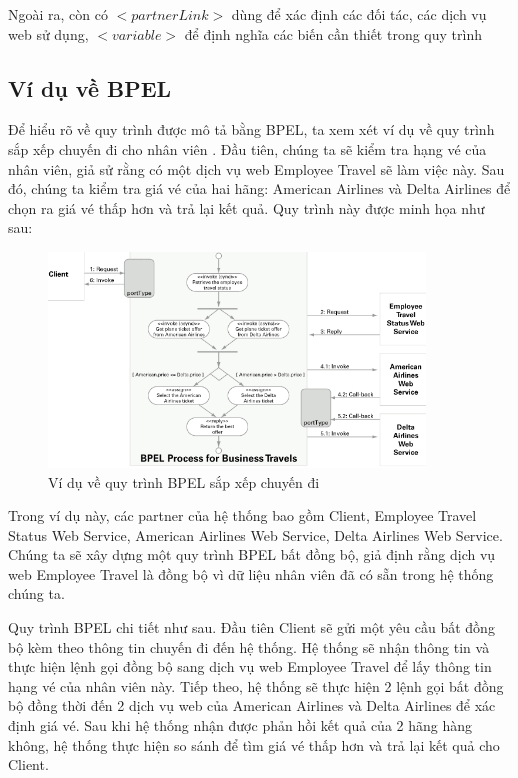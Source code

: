 Ngoài ra, còn có $<partnerLink>$ dùng để xác định các đối tác, các dịch vụ web sử dụng, $<variable>$ để định nghĩa các biến cần thiết trong quy trình


\subsection{Ví dụ về BPEL}

\hspace*{0.5cm} Để hiểu rõ về quy trình được mô tả bằng BPEL, ta xem xét ví dụ về quy trình sắp xếp chuyến đi cho nhân viên \cite{theoryBPEL}. Đầu tiên, chúng ta sẽ kiểm tra hạng vé của nhân viên, giả sử rằng có một dịch vụ web Employee Travel sẽ làm việc này. Sau đó, chúng ta kiểm tra giá vé của hai hãng: American Airlines và Delta Airlines để chọn ra giá vé thấp hơn và trả lại kết quả. Quy trình này được minh họa như sau:

\begin{figure}[!htp]
    \begin{center}
        \includegraphics[width=10cm]{img/theory/BPEL/Sample.png}
    \end{center}
    \caption{Ví dụ về quy trình BPEL sắp xếp chuyến đi \cite{theoryBPEL}}
\end{figure}

Trong ví dụ này, các partner của hệ thống bao gồm Client, Employee Travel Status Web Service, American Airlines Web Service, Delta Airlines Web Service. Chúng ta sẽ xây dựng một quy trình BPEL bất đồng bộ, giả định rằng dịch vụ web Employee Travel là đồng bộ vì dữ liệu nhân viên đã có sẵn trong hệ thống chúng ta.

Quy trình BPEL chi tiết như sau. Đầu tiên Client sẽ gửi một yêu cầu bất đồng bộ kèm theo thông tin chuyến đi đến hệ thống. Hệ thống sẽ nhận thông tin và thực hiện lệnh gọi đồng bộ sang dịch vụ web Employee Travel để lấy thông tin hạng vé của nhân viên này. Tiếp theo, hệ thống sẽ thực hiện 2 lệnh gọi bất đồng bộ đồng thời đến 2 dịch vụ web của American Airlines và Delta Airlines để xác định giá vé. Sau khi hệ thống nhận được phản hồi kết quả của 2 hãng hàng không, hệ thống thực hiện so sánh để tìm giá vé thấp hơn và trả lại kết quả cho Client.

